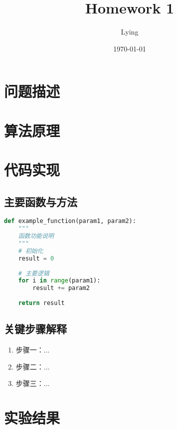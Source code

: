 \documentclass[letterpaper,12pt]{article}
\title{Homework 1}
\author{Lying}
\date{\today}
\begin{document}
\maketitle

\begin{abstract}
\end{abstract}

\section{问题描述}

\section{算法原理}

\section{代码实现}

\subsection{主要函数与方法}
\begin{lstlisting}[language=Python, caption=示例代码]
def example_function(param1, param2):
    """
    函数功能说明
    """
    # 初始化
    result = 0
    
    # 主要逻辑
    for i in range(param1):
        result += param2
        
    return result
\end{lstlisting}

\subsection{关键步骤解释}
\begin{enumerate}[label=\arabic*., leftmargin=*]
    \item 步骤一：...
    \item 步骤二：...
    \item 步骤三：...
\end{enumerate}

\section{实验结果}
\end{document}
